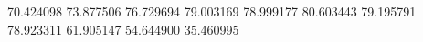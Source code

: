70.424098
73.877506
76.729694
79.003169
78.999177
80.603443
79.195791
78.923311
61.905147
54.644900
35.460995
